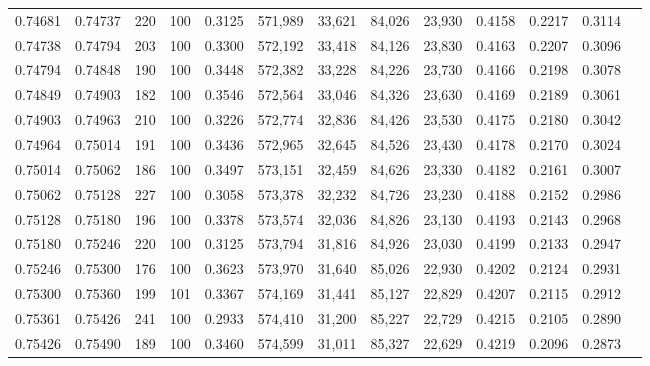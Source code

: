 \begin{tabular}{rrrrrrrrrrrrr}
0.74681 & 0.74737 &   220 & 100 &                                     0.3125 & 571,989 &  33,621 &  84,026 &  23,930 & 0.4158 & 0.2217 & 0.3114 \\
0.74738 & 0.74794 &   203 & 100 &                                     0.3300 & 572,192 &  33,418 &  84,126 &  23,830 & 0.4163 & 0.2207 & 0.3096 \\
0.74794 & 0.74848 &   190 & 100 &                                     0.3448 & 572,382 &  33,228 &  84,226 &  23,730 & 0.4166 & 0.2198 & 0.3078 \\
0.74849 & 0.74903 &   182 & 100 &                                     0.3546 & 572,564 &  33,046 &  84,326 &  23,630 & 0.4169 & 0.2189 & 0.3061 \\
0.74903 & 0.74963 &   210 & 100 &                                     0.3226 & 572,774 &  32,836 &  84,426 &  23,530 & 0.4175 & 0.2180 & 0.3042 \\
0.74964 & 0.75014 &   191 & 100 &                                     0.3436 & 572,965 &  32,645 &  84,526 &  23,430 & 0.4178 & 0.2170 & 0.3024 \\
0.75014 & 0.75062 &   186 & 100 &                                     0.3497 & 573,151 &  32,459 &  84,626 &  23,330 & 0.4182 & 0.2161 & 0.3007 \\
0.75062 & 0.75128 &   227 & 100 &                                     0.3058 & 573,378 &  32,232 &  84,726 &  23,230 & 0.4188 & 0.2152 & 0.2986 \\
0.75128 & 0.75180 &   196 & 100 &                                     0.3378 & 573,574 &  32,036 &  84,826 &  23,130 & 0.4193 & 0.2143 & 0.2968 \\
0.75180 & 0.75246 &   220 & 100 &                                     0.3125 & 573,794 &  31,816 &  84,926 &  23,030 & 0.4199 & 0.2133 & 0.2947 \\
0.75246 & 0.75300 &   176 & 100 &                                     0.3623 & 573,970 &  31,640 &  85,026 &  22,930 & 0.4202 & 0.2124 & 0.2931 \\
0.75300 & 0.75360 &   199 & 101 &                                     0.3367 & 574,169 &  31,441 &  85,127 &  22,829 & 0.4207 & 0.2115 & 0.2912 \\
0.75361 & 0.75426 &   241 & 100 &                                     0.2933 & 574,410 &  31,200 &  85,227 &  22,729 & 0.4215 & 0.2105 & 0.2890 \\
0.75426 & 0.75490 &   189 & 100 &                                     0.3460 & 574,599 &  31,011 &  85,327 &  22,629 & 0.4219 & 0.2096 & 0.2873 \\

\end{tabular}
